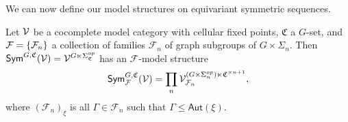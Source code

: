 \documentclass[a4paper,10pt
,draft
]{article}%
\renewcommand{\F}{\mathcal F}
\renewcommand{\1}{\eta}%
\newcommand{\UC}{\underline{\mathfrak C}}
\begin{document}
We can now define our model structures on equivariant symmetric sequences.

\begin{example}
      Let $\mathcal V$ be a cocomplete model category with cellular fixed points,
      $\mathfrak C$ a $G$-set, and $\F = \set{\F_n}$ a collection of families $\F_n$ of graph subgroups of $G \times \Sigma_n$.
      Then $\mathsf{Sym}^{G,\mathfrak C}(\mathcal V) = \mathcal V^{G \ltimes \Sigma_{\mathfrak C}^{op}}$ has an $\F$-model structure
      \begin{equation}
            \Sym^{G,\mathfrak C}_\F(\V) = \prod_n \V^{(G \times \Sigma_n^{op}) \ltimes \mathfrak C^{\times n+1}}_{\F_n},
      \end{equation}
      where
      $(\F_n)_{\xi}$ is all $\Gamma \in \F_n$ such that $\Gamma \leq \mathsf{Aut}(\xi)$.
\end{example}


\end{document}
